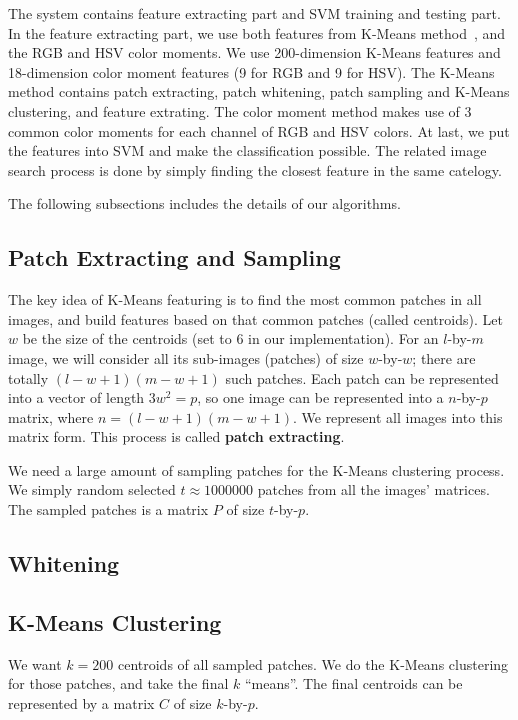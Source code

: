 \documentclass{acm_proc_article-sp}
\begin{document}
The system contains feature extracting part and SVM training and testing part.
In the feature extracting part,
    we use both features from K-Means method~\cite{coates2011analysis},
    and the RGB and HSV color moments.
We use 200-dimension K-Means features and 18-dimension color moment
features (9 for RGB and 9 for HSV).
The K-Means method contains patch extracting, patch whitening,
    patch sampling and K-Means clustering,
    and feature extrating.
The color moment method makes use of 3 common color moments for 
    each channel of RGB and HSV colors.
At last, we put the features into SVM and make the classification possible.
The related image search process is done by simply finding
    the closest feature in the same catelogy.

The following subsections includes the details of our algorithms.

\subsection{Patch Extracting and Sampling}

The key idea of K-Means featuring is to find the most common
    patches in all images, and build features based on that
    common patches (called centroids).
Let $w$ be the size of the centroids (set to $6$ in our implementation).
For an $l$-by-$m$ image,
we will consider all its sub-images (patches) of size $w$-by-$w$;
there are totally $(l-w+1)(m-w+1)$ such patches.
Each patch can be represented into a vector of length $3w^2 = p$,
    so one image can be represented into a $n$-by-$p$ matrix,
    where $n=(l-w+1)(m-w+1)$.
We represent all images into this matrix form.
This process is called \textbf{patch extracting}.

We need a large amount of sampling patches for the K-Means clustering process.
We simply random selected $t\approx 1000000$ patches
    from all the images' matrices.
The sampled patches is a matrix $P$ of size $t$-by-$p$.

\subsection{Whitening}


\subsection{K-Means Clustering}

We want $k=200$ centroids of all sampled patches.
We do the K-Means clustering for those patches,
    and take the final $k$ ``means''.
The final centroids can be represented by a matrix $C$ of size $k$-by-$p$.
\end{document}
